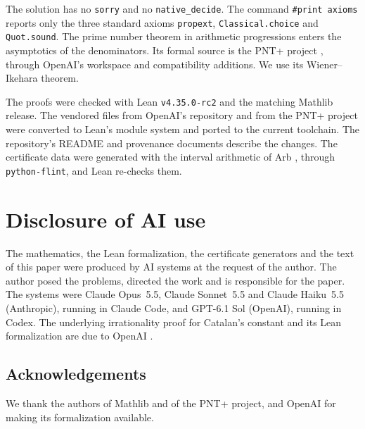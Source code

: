 \documentclass[11pt]{amsart}
\theoremstyle{definition}
\theoremstyle{remark}
\numberwithin{equation}{section}
\newcommand{\lean}[1]{\nolinkurl{#1}}
\begin{document}
The solution has no \lean{sorry} and no \lean{native_decide}. The command \texttt{\#print axioms} reports only the three
standard axioms \lean{propext}, \lean{Classical.choice} and \lean{Quot.sound}. The prime number theorem in arithmetic
progressions enters the asymptotics of the denominators. Its formal source is the PNT+ project \cite{PNTPlus}, through OpenAI's
workspace and compatibility additions. We use its Wiener--Ikehara theorem.

The proofs were checked with Lean \texttt{v4.35.0-rc2} and the matching Mathlib release. The vendored files from OpenAI's
repository and from the PNT+ project were converted to Lean's module system and ported to the current toolchain. The repository's README and provenance documents describe the changes. The certificate data were generated with
the interval arithmetic of Arb \cite{Arb}, through \texttt{python-flint}, and Lean re-checks them.

\section*{Disclosure of AI use}
The mathematics, the Lean formalization, the certificate generators and the text of this paper were produced by AI
systems at the request of the author. The author posed the problems, directed the work and is responsible for the
paper. The systems were Claude Opus~5.5, Claude Sonnet~5.5 and Claude Haiku~5.5 (Anthropic), running in Claude Code,
and GPT-6.1 Sol (OpenAI), running in Codex. The underlying irrationality proof for Catalan's constant and its Lean
formalization are due to OpenAI \cite{OpenAI2026}.

\subsection*{Acknowledgements}
We thank the authors of Mathlib and of the PNT+ project, and OpenAI for making its formalization available.
\end{document}
